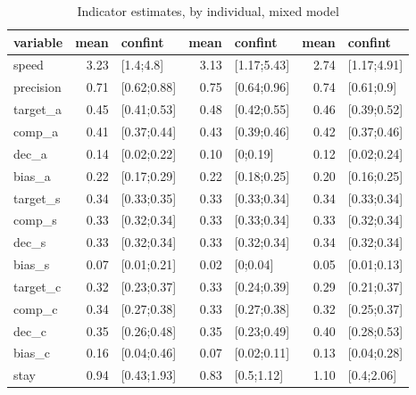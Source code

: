 \begin{table}

\caption{Indicator estimates, by individual, mixed model}
\centering
\begin{tabular}[t]{lrlrlrl}
\toprule
variable & mean & confint & mean & confint & mean & confint\\
\midrule
speed & 3.23 & {}[1.4;4.8] & 3.13 & {}[1.17;5.43] & 2.74 & {}[1.17;4.91]\\
precision & 0.71 & {}[0.62;0.88] & 0.75 & {}[0.64;0.96] & 0.74 & {}[0.61;0.9]\\
target_a & 0.45 & {}[0.41;0.53] & 0.48 & {}[0.42;0.55] & 0.46 & {}[0.39;0.52]\\
comp_a & 0.41 & {}[0.37;0.44] & 0.43 & {}[0.39;0.46] & 0.42 & {}[0.37;0.46]\\
dec_a & 0.14 & {}[0.02;0.22] & 0.10 & {}[0;0.19] & 0.12 & {}[0.02;0.24]\\
\addlinespace
bias_a & 0.22 & {}[0.17;0.29] & 0.22 & {}[0.18;0.25] & 0.20 & {}[0.16;0.25]\\
target_s & 0.34 & {}[0.33;0.35] & 0.33 & {}[0.33;0.34] & 0.34 & {}[0.33;0.34]\\
comp_s & 0.33 & {}[0.32;0.34] & 0.33 & {}[0.33;0.34] & 0.33 & {}[0.32;0.34]\\
dec_s & 0.33 & {}[0.32;0.34] & 0.33 & {}[0.32;0.34] & 0.34 & {}[0.32;0.34]\\
bias_s & 0.07 & {}[0.01;0.21] & 0.02 & {}[0;0.04] & 0.05 & {}[0.01;0.13]\\
\addlinespace
target_c & 0.32 & {}[0.23;0.37] & 0.33 & {}[0.24;0.39] & 0.29 & {}[0.21;0.37]\\
comp_c & 0.34 & {}[0.27;0.38] & 0.33 & {}[0.27;0.38] & 0.32 & {}[0.25;0.37]\\
dec_c & 0.35 & {}[0.26;0.48] & 0.35 & {}[0.23;0.49] & 0.40 & {}[0.28;0.53]\\
bias_c & 0.16 & {}[0.04;0.46] & 0.07 & {}[0.02;0.11] & 0.13 & {}[0.04;0.28]\\
stay & 0.94 & {}[0.43;1.93] & 0.83 & {}[0.5;1.12] & 1.10 & {}[0.4;2.06]\\
\bottomrule
\end{tabular}
\end{table}
